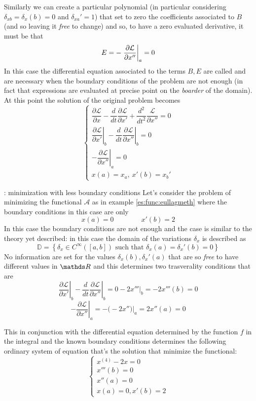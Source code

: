 	Similarly we can create a particular polynomial (in particular considering $ \delta_{xb} = \delta_x(b) = 0$ and $\delta_{xa}' = 1$) that set to zero the coefficients associated to $B$ (and so leaving it \textit{free} to change) and so, to have a zero evaluated derivative, it must be that
	\[ E = - \left. \frac{\partial \mathcal L}{\partial x''} \right|_a = 0 \] 
	In this case the differential equation associated to the terms $B,E$ are called  and are necessary when the boundary conditions of the problem are not enough (in fact that expressions are evaluated at precise point on the \textit{boarder} of the domain). At this point the solution of the original problem becomes
	\[ \begin{cases}
		\dfrac{\partial \mathcal L}{\partial x} - \dfrac{d}{dt} \dfrac{\partial \mathcal L}{\partial x'} + \dfrac{d^2}{dt^2} \dfrac{\mathcal L}{\partial x''} = 0 \\
		\left.\dfrac{\partial \mathcal L}{\partial x'} \right|_b - \left. \dfrac{d}{dt} \dfrac{\partial \mathcal L}{\partial x''} \right|_b = 0\\
		-\left. \dfrac{\partial \mathcal L}{\partial x''} \right|_a = 0 \\
		x(a) = x_a, \ x'(b) = x_b'
	\end{cases} \]

	\begin{example}{: minimization with less boundary conditions}
		Let's consider the problem of minimizing the functional $\mathcal A$ as in example \ref{es:func:eullagmeth} where the boundary conditions in this case are only
		\[ x(a) = 0 \qquad \qquad x'(b) = 2  \]
		In this case the boundary conditions are not enough and the case is similar to the theory yet described: in this case the domain of the variations $\delta_x$ is described as
		\[ \mathds D = \left\{ \delta_x\in C^\infty([a,b]) \textrm{ such that } \delta_x(a) =\delta_x'(b) = 0 \right\} \]
		No information are set for the values $\delta_x(b), \delta_x'(a)$ that are so \textit{free} to have different values in $\R$ and this determines two trasverality conditions that are
		\[ \left.\dfrac{\partial \mathcal L}{\partial x'} \right|_b - \left. \dfrac{d}{dt} \dfrac{\partial \mathcal L}{\partial x''} \right|_b = 0-2x'''\Big|_b = -2x'''(b) = 0 \]\[ -\left. \dfrac{\partial \mathcal L}{\partial x''} \right|_a = - \big(-2x''\big)\Big|_a = 2x''(a) = 0   \]
		
		This in conjunction with the differential equation determined by the function $f$ in the integral and the known boundary conditions determines the following ordinary system of equation that's the solution that minimize the functional:
		\[ \begin{cases}
			x^{(4)} - 2x = 0 \\
			x'''(b) = 0 \\ x''(a) = 0 \\
			x(a) = 0, x'(b) = 2
		\end{cases} \]		
	\end{example}
	
